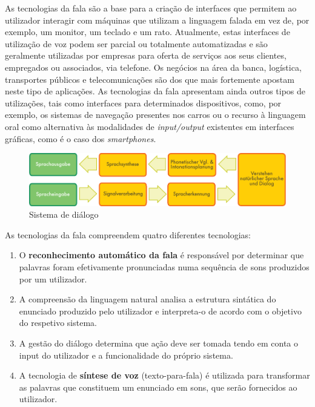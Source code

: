 \documentclass[]{../metanetpaper}
\begin{document}
\begin{multicols}{2}
 As tecnologias da fala são a base para a criação de interfaces que permitem ao utilizador interagir com máquinas que utilizam a linguagem falada em vez de, por exemplo, um monitor, um teclado e um rato. Atualmente, estas interfaces de utilização de voz podem ser parcial ou totalmente automatizadas e são geralmente utilizadas por empresas para oferta de serviços aos seus clientes, empregados ou associados, via telefone. Os negócios na área da banca, logística, transportes públicos e telecomunicações são dos que mais fortemente apostam neste tipo de aplicações. As tecnologias da fala apresentam ainda outros tipos de utilizações, tais como interfaces para determinados dispositivos, como, por exemplo, os sistemas de navegação presentes nos carros ou o recurso à linguagem oral como alternativa às mo\-da\-li\-da\-des de \textit{input/output} existentes em interfaces gráficas, como é o caso dos \textit{smartphones}.


\begin{figure}[htb]
  \center 
  \includegraphics[width=\textwidth]{../_media/german/simple_speech-based_dialogue_architecture}
  \caption{Sistema de diálogo}
  \label{fig:dialoguearch_de}
\end{figure}

As tecnologias da fala compreendem quatro diferentes tecnologias:

\begin{enumerate}
  \item O \textbf{reconhecimento automático da fala} é responsável por determinar que palavras foram efetivamente pronunciadas numa sequência de sons produzidos por um utilizador.
      \item A compreensão da linguagem natural analisa a estrutura sintática do enunciado produzido pelo utilizador e interpreta-o de acordo com o objetivo do respetivo sistema.
      \item A gestão do diálogo determina que ação deve ser tomada tendo em conta o input do utilizador e a funcionalidade do próprio sistema.
      \item A tecnologia de \textbf{síntese de voz} (texto-para-fala) é utilizada para transformar as palavras que constituem um enunciado em sons, que serão fornecidos ao utilizador.
\end{enumerate}


\end{multicols}
\end{document}
